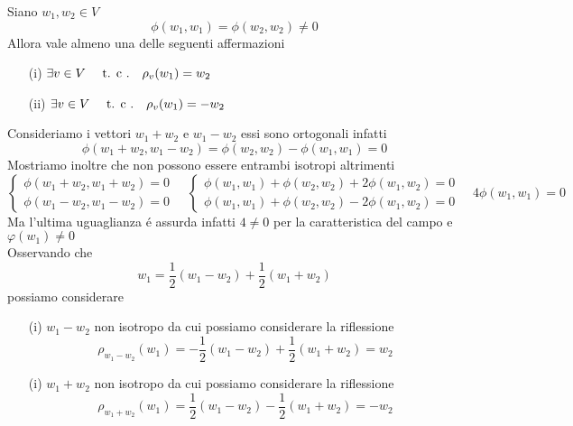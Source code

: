 \spazio
\begin{prop}\label{rifle}Siano $w_1, w_2 \in V $  $$ \phi (w_1,w_1) = \phi(w_2,w_2) \neq 0  $$
Allora vale almeno una delle seguenti affermazioni
\begin{itemize}
\item[(i)]$ \exists v \in V \quad \text{ t. c .} \quad \rho_v (w_1) =w_2 $
\item[(ii)]$ \exists v \in V \quad \text{ t. c .} \quad \rho_v (w_1) =-w_2 $
\end{itemize}
\proof 
Consideriamo i vettori $w_1+ w_2 $ e $w_1 - w_2 $ essi sono ortogonali infatti 
$$ \phi(w_1+ w_2, w_1 - w_2) = \phi(w_2, w_2) - \phi(w_1, w_1) = 0 $$
Mostriamo inoltre che non possono essere entrambi isotropi altrimenti
$$ \begin{cases} \phi(w_1+w_2,w_1+w_2) = 0  \\ 
\phi(w_1-w_2,w_1-w_2) = 0 
\end{cases} 
\quad 
\begin{cases} \phi(w_1,w_1) + \phi(w_2,w_2)  + 2 \phi(w_1, w_2 ) = 0 \\
\phi(w_1,w_1) + \phi(w_2,w_2) - 2 \phi(w_1, w_2 ) = 0
\end{cases}
\quad 4 \phi(w_1,w_1) = 0 
$$
Ma l'ultima uguaglianza \'e assurda infatti $4 \neq 0 $ per la caratteristica del campo  e $\varphi(w_1) \neq 0 $ \\

Osservando che  
$$ w_1 = \frac{1}{2} ( w_1 - w_2) + \frac{1}{2}( w_1+ w_2) $$
possiamo considerare 
\begin{itemize}
\item[(i)]$w_1-w_2 $ non isotropo da cui possiamo considerare la riflessione
$$ \rho_{w_1-w_2}(w_1) =- \frac{1}{2} ( w_1 - w_2) + \frac{1}{2}( w_1+ w_2)=w_2 $$
\item[(i)]$w_1+w_2 $ non isotropo da cui possiamo considerare la riflessione
$$ \rho_{w_1+w_2}(w_1) = \frac{1}{2} ( w_1 - w_2) - \frac{1}{2}( w_1+ w_2)=-w_2 $$
\end{itemize}
\endproof
\end{prop}

